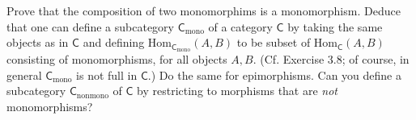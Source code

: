 \documentclass[../../master.tex]{subfiles}
\begin{document}
    \begin{problem}
      Prove that the composition of two monomorphims is a monomorphism.
      Deduce that one can define a subcategory \(\mathsf{C}_{\text{mono}}\) of a category \(\mathsf{C}\)
      by taking the same objects as in \(\mathsf{C}\) and defining \(\text{Hom}_{\mathsf{C}_{\text{mono}}}(A, B)\)
      to be subset of \(\text{Hom}_{\mathsf{C}}(A, B)\) consisting of monomorphisms, for all objects \(A, B\).
      (Cf. Exercise 3.8; of course, in general \(\mathsf{C}_{\text{mono}}\) is not full in \(\mathsf{C}\).)
      Do the same for epimorphisms.
      Can you define a subcategory \(\mathsf{C}_{\text{nonmono}}\) of \(\mathsf{C}\) by restricting to morphisms that are \textit{not} monomorphisms?
    \end{problem}
\end{document}

